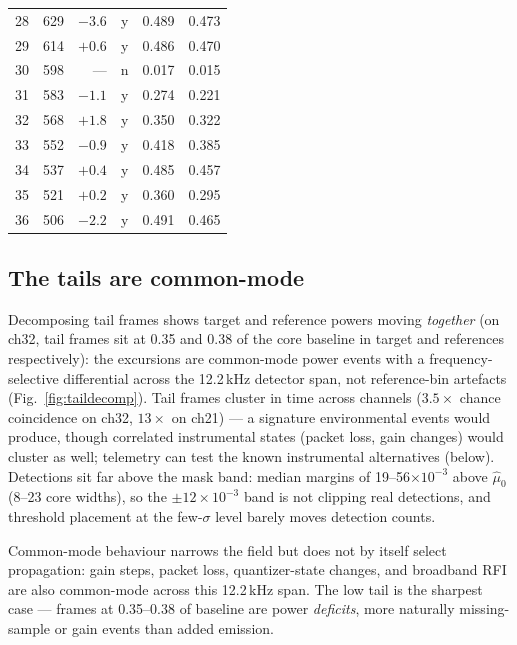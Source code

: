 \begin{table}
\begin{tabular}{rrrcrr}
    28 & 629 & $-3.6$ & y & 0.489 & 0.473 \\
    29 & 614 & $+0.6$ & y & 0.486 & 0.470 \\
    30 & 598 & --- & n & 0.017 & 0.015 \\
    31 & 583 & $-1.1$ & y & 0.274 & 0.221 \\
    32 & 568 & $+1.8$ & y & 0.350 & 0.322 \\
    33 & 552 & $-0.9$ & y & 0.418 & 0.385 \\
    34 & 537 & $+0.4$ & y & 0.485 & 0.457 \\
    35 & 521 & $+0.2$ & y & 0.360 & 0.295 \\
    36 & 506 & $-2.2$ & y & 0.491 & 0.465 \\
    \bottomrule
  \end{tabular}
\end{table}

\subsection{The tails are common-mode}
\label{sec:propagation}

Decomposing tail frames shows target and reference powers moving
\emph{together} (on ch32, tail frames sit at 0.35 and 0.38 of the core
baseline in target and references respectively): the excursions are
common-mode power events with a frequency-selective differential across the
12.2\,kHz detector span, not reference-bin artefacts
(Fig.~\ref{fig:taildecomp}). Tail frames cluster in time across channels
($3.5\times$ chance coincidence on ch32, $13\times$ on ch21) --- a
signature environmental events would produce, though correlated
instrumental states (packet loss, gain changes) would cluster as well;
telemetry can test the known instrumental alternatives (below).
Detections sit
far above the mask band: median margins of 19--56$\times 10^{-3}$ above
$\hat\mu_0$ (8--23 core widths), so the $\pm 12\times10^{-3}$ band is not
clipping real detections, and threshold placement at the few-$\sigma$ level
barely moves detection counts.

Common-mode behaviour narrows the field but does not by itself select
propagation: gain steps, packet loss, quantizer-state changes, and
broadband RFI are also common-mode across this 12.2\,kHz span. The low
tail is the sharpest case --- frames at 0.35--0.38 of baseline are power
\emph{deficits}, more naturally missing-sample or gain events than added
emission. 

